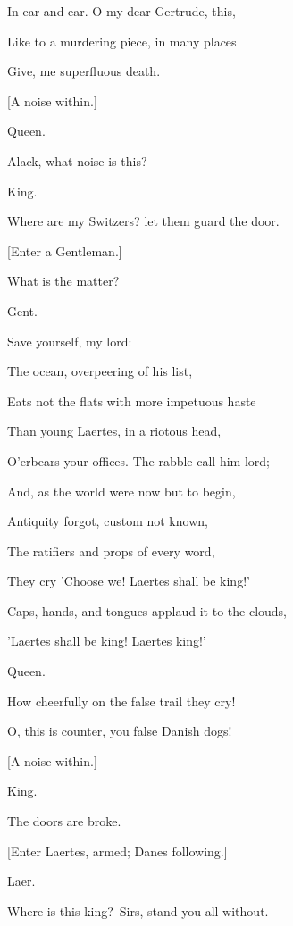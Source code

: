 \documentclass[12pt]{book}
\begin{document}
In ear and ear. O my dear Gertrude, this,

Like to a murdering piece, in many places

Give, me superfluous death.



[A noise within.]



Queen.

Alack, what noise is this?



King.

Where are my Switzers? let them guard the door.



[Enter a Gentleman.]



What is the matter?



Gent.

Save yourself, my lord:

The ocean, overpeering of his list,

Eats not the flats with more impetuous haste

Than young Laertes, in a riotous head,

O'erbears your offices. The rabble call him lord;

And, as the world were now but to begin,

Antiquity forgot, custom not known,

The ratifiers and props of every word,

They cry 'Choose we! Laertes shall be king!'

Caps, hands, and tongues applaud it to the clouds,

'Laertes shall be king! Laertes king!'



Queen.

How cheerfully on the false trail they cry!

O, this is counter, you false Danish dogs!



[A noise within.]



King.

The doors are broke.



[Enter Laertes, armed; Danes following.]



Laer.

Where is this king?--Sirs, stand you all without.
\end{document}
